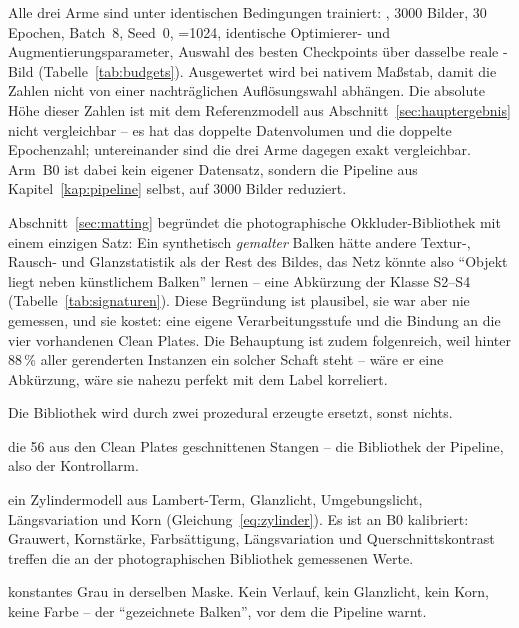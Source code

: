  Alle drei Arme sind unter identischen Bedingungen trainiert:
, 3000 Bilder, 30 Epochen, Batch~8, Seed~0, =1024,
identische Optimierer- und Augmentierungsparameter, Auswahl des besten
Checkpoints über dasselbe reale -Bild (Tabelle~\ref{tab:budgets}).
Ausgewertet wird bei nativem Maßstab, damit die Zahlen nicht von einer
nachträglichen Auflösungswahl abhängen. Die absolute Höhe dieser Zahlen ist mit
dem Referenzmodell aus Abschnitt~\ref{sec:hauptergebnis} nicht vergleichbar --
es hat das doppelte Datenvolumen und die doppelte Epochenzahl; untereinander
sind die drei Arme dagegen exakt vergleichbar. Arm~B0 ist dabei kein eigener
Datensatz, sondern die Pipeline aus Kapitel~\ref{kap:pipeline} selbst, auf 3000
Bilder reduziert.

 Abschnitt~\ref{sec:matting} begründet die
photographische Okkluder-Bibliothek mit einem einzigen Satz: Ein synthetisch
\emph{gemalter} Balken hätte andere Textur-, Rausch- und Glanzstatistik als der
Rest des Bildes, das Netz könnte also \enquote{Objekt liegt neben künstlichem
Balken} lernen -- eine Abkürzung der Klasse S2--S4
(Tabelle~\ref{tab:signaturen}). Diese Begründung ist plausibel, sie war aber nie
gemessen, und sie kostet: eine eigene Verarbeitungsstufe und die Bindung an die
vier vorhandenen Clean Plates. Die Behauptung ist zudem folgenreich, weil hinter
88\,\% aller gerenderten Instanzen ein solcher Schaft steht -- wäre er eine
Abkürzung, wäre sie nahezu perfekt mit dem Label korreliert.

 Die Bibliothek wird durch zwei prozedural erzeugte
ersetzt, sonst nichts.

\begin{description}[leftmargin=1.4em,itemsep=2pt,font=\normalfont\bfseries]
  \item[B0 photographisch] die 56 aus den Clean Plates geschnittenen Stangen --
  die Bibliothek der Pipeline, also der Kontrollarm.
  \item[B1 prozedural, physikalisch] ein Zylindermodell aus Lambert-Term,
  Glanzlicht, Umgebungslicht, Längsvariation und Korn
  (Gleichung~\eqref{eq:zylinder}). Es ist an B0 kalibriert: Grauwert, Kornstärke,
  Farbsättigung, Längsvariation und Querschnittskontrast treffen die an der
  photographischen Bibliothek gemessenen Werte.
  \item[B2 prozedural, naiv] konstantes Grau in derselben Maske. Kein Verlauf,
  kein Glanzlicht, kein Korn, keine Farbe -- der \enquote{gezeichnete Balken},
  vor dem die Pipeline warnt.
\end{description}

